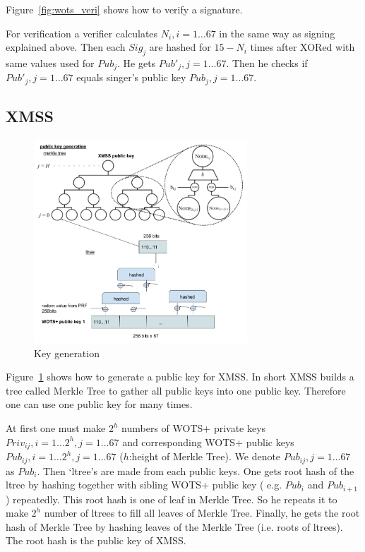 \documentclass[a4paper,10pt,twocolumn]{article}
\begin{document}
 Figure~\ref{fig:wots_veri} shows  how to verify a signature.

 For verification a verifier calculates \(N_i, i=1 \ldots 67 \) in the same way as signing explained above.
 Then each \( Sig_j \) are hashed for \(15-N_i\)  times after XORed with same  values  used for \( Pub_{j} \).
 He gets \( Pub'_j , j=1 \ldots 67\). Then he checks if  \( Pub'_j,  j=1 \ldots 67 \) equals singer's public key \( Pub_j,  j=1 \ldots 67 \).

\subsection{XMSS}

\begin{figure}[ht]
	\begin{center}
	\includegraphics[width=80mm]{xmss_pub.png}
	  \caption{Key generation}
    \label{fig:xmss_pub}
	\end{center}
 \end{figure}

Figure~\ref{fig:xmss_pub} shows how to generate a public key for XMSS. In short XMSS builds a tree called Merkle Tree
to gather all public keys into one public key. Therefore one can use one public key for many times.

At first one must make \( 2^h \)  numbers of WOTS+ private keys \( Priv_{ij}, i = 1 \ldots 2^h ,  j=1 \ldots 67\) and 
corresponding WOTS+ public keys \( Pub_{ij}, i = 1 \ldots 2^h , j=1 \ldots 67 \)  (\(h\):height of Merkle Tree).
We denote \( Pub_{ij} , j=1 \ldots 67 \) as  \( Pub_{i} \).
Then  `ltree's are made
from each public keys. One gets root hash of the ltree by hashing together with sibling WOTS+ public key
( e.g.  \( Pub_{i} \) and  \( Pub_{i+1} \) ) repeatedly. This root hash is one of leaf
in Merkle Tree.
So he repeats it to make \( 2^h \) number of ltrees to fill all leaves of Merkle Tree.
Finally, he gets the root hash of Merkle Tree by hashing leaves of the Merkle Tree (i.e. roots of ltrees).
The root hash is the public key of XMSS.
\end{document}
